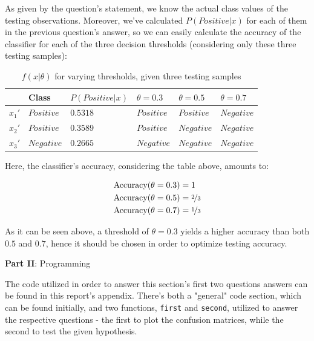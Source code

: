 \documentclass[12pt]{article}
\begin{document}
\begin{enumerate}[leftmargin=\labelsep]
        As given by the question's statement, we know the actual class values of the testing observations.
        Moreover, we've calculated $P(Positive | x)$ for each of them in the previous question's answer,
        so we can easily calculate the accuracy of the classifier for each of the three decision thresholds
        (considering only these three testing samples):

        \begin{table}[h]
          \centering
          \begin{tabular}{l|l|l|l|l|l}
            \hline
                   & Class      & $P(Positive | x)$ & $\theta = 0.3$ & $\theta = 0.5$ & $\theta = 0.7$ \\ \hline
            $x_1'$ & $Positive$ & $0.5318$          & $Positive$     & $Positive$     & $Negative$     \\ \hline
            $x_2'$ & $Positive$ & $0.3589$          & $Positive$     & $Negative$     & $Negative$     \\ \hline
            $x_3'$ & $Negative$ & $0.2665$          & $Negative$     & $Negative$     & $Negative$     \\ \hline
          \end{tabular}
          \caption{$f(x | \theta)$ for varying thresholds, given three testing samples}
          \label{tab:thresholds}
        \end{table}

        Here, the classifier's accuracy, considering the table above, amounts to:

        \begin{align*}
          \text{Accuracy}(\theta = 0.3) & = 1               \\
          \text{Accuracy}(\theta = 0.5) & = \nicefrac{2}{3} \\
          \text{Accuracy}(\theta = 0.7) & = \nicefrac{1}{3}
        \end{align*}

        As it can be seen above, a threshold of $\theta = 0.3$ yields a higher accuracy than
        both $0.5$ and $0.7$, hence it should be chosen in order to optimize testing accuracy.

\end{enumerate}

\pagebreak

\center\large{\textbf{Part II}: Programming}

\begin{justify}
  The code utilized in order to answer this section's first two questions answers
  can be found in this report's appendix. There's both a "general" code section,
  which can be found initially, and two functions, \texttt{first} and \texttt{second},
  utilized to answer the respective questions - the first to plot the confusion matrices,
  while the second to test the given hypothesis.
\end{justify}
\end{document}
